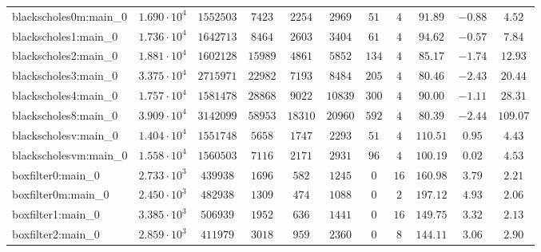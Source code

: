 \begin{tabular}{|l|c|c|c|c|c|c|c|c|c|c|}
blackscholes0m:main\_0         & $ 1.690 \cdot 10^{4} $ & $ 1552503  $ & $ 7423   $ & $ 2254   $ & $ 2969   $ & $ 51   $ & $ 4    $ & $ 91.89       $ & $ -0.88   $ & $ 4.52    $ \\
blackscholes1:main\_0          & $ 1.736 \cdot 10^{4} $ & $ 1642713  $ & $ 8464   $ & $ 2603   $ & $ 3404   $ & $ 61   $ & $ 4    $ & $ 94.62       $ & $ -0.57   $ & $ 7.84    $ \\
blackscholes2:main\_0          & $ 1.881 \cdot 10^{4} $ & $ 1602128  $ & $ 15989  $ & $ 4861   $ & $ 5852   $ & $ 134  $ & $ 4    $ & $ 85.17       $ & $ -1.74   $ & $ 12.93   $ \\
blackscholes3:main\_0          & $ 3.375 \cdot 10^{4} $ & $ 2715971  $ & $ 22982  $ & $ 7193   $ & $ 8484   $ & $ 205  $ & $ 4    $ & $ 80.46       $ & $ -2.43   $ & $ 20.44   $ \\
blackscholes4:main\_0          & $ 1.757 \cdot 10^{4} $ & $ 1581478  $ & $ 28868  $ & $ 9022   $ & $ 10839  $ & $ 300  $ & $ 4    $ & $ 90.00       $ & $ -1.11   $ & $ 28.31   $ \\
blackscholes8:main\_0          & $ 3.909 \cdot 10^{4} $ & $ 3142099  $ & $ 58953  $ & $ 18310  $ & $ 20960  $ & $ 592  $ & $ 4    $ & $ 80.39       $ & $ -2.44   $ & $ 109.07  $ \\
blackscholesv:main\_0          & $ 1.404 \cdot 10^{4} $ & $ 1551748  $ & $ 5658   $ & $ 1747   $ & $ 2293   $ & $ 51   $ & $ 4    $ & $ 110.51      $ & $ 0.95    $ & $ 4.43    $ \\
blackscholesvm:main\_0         & $ 1.558 \cdot 10^{4} $ & $ 1560503  $ & $ 7116   $ & $ 2171   $ & $ 2931   $ & $ 96   $ & $ 4    $ & $ 100.19      $ & $ 0.02    $ & $ 4.53    $ \\
boxfilter0:main\_0             & $ 2.733 \cdot 10^{3} $ & $ 439938   $ & $ 1696   $ & $ 582    $ & $ 1245   $ & $ 0    $ & $ 16   $ & $ 160.98      $ & $ 3.79    $ & $ 2.21    $ \\
boxfilter0m:main\_0            & $ 2.450 \cdot 10^{3} $ & $ 482938   $ & $ 1309   $ & $ 474    $ & $ 1088   $ & $ 0    $ & $ 2    $ & $ 197.12      $ & $ 4.93    $ & $ 2.06    $ \\
boxfilter1:main\_0             & $ 3.385 \cdot 10^{3} $ & $ 506939   $ & $ 1952   $ & $ 636    $ & $ 1441   $ & $ 0    $ & $ 16   $ & $ 149.75      $ & $ 3.32    $ & $ 2.13    $ \\
boxfilter2:main\_0             & $ 2.859 \cdot 10^{3} $ & $ 411979   $ & $ 3018   $ & $ 959    $ & $ 2360   $ & $ 0    $ & $ 8    $ & $ 144.11      $ & $ 3.06    $ & $ 2.90    $ \\

\end{tabular}
